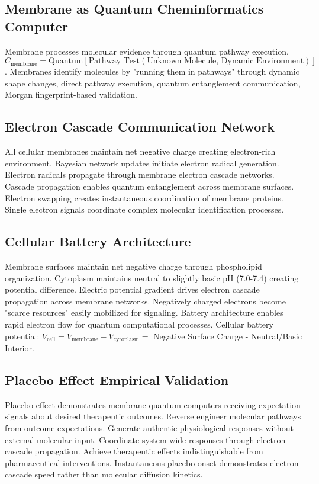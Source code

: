 \documentclass[12pt,a4paper]{article}
\begin{document}
\subsection{Membrane as Quantum Cheminformatics Computer}

Membrane processes molecular evidence through quantum pathway execution. $C_{\text{membrane}} = \text{Quantum}[\text{Pathway Test}(\text{Unknown Molecule, Dynamic Environment})]$. Membranes identify molecules by "running them in pathways" through dynamic shape changes, direct pathway execution, quantum entanglement communication, Morgan fingerprint-based validation.

\subsection{Electron Cascade Communication Network}

All cellular membranes maintain net negative charge creating electron-rich environment. Bayesian network updates initiate electron radical generation. Electron radicals propagate through membrane electron cascade networks. Cascade propagation enables quantum entanglement across membrane surfaces. Electron swapping creates instantaneous coordination of membrane proteins. Single electron signals coordinate complex molecular identification processes.

\subsection{Cellular Battery Architecture}

Membrane surfaces maintain net negative charge through phospholipid organization. Cytoplasm maintains neutral to slightly basic pH (7.0-7.4) creating potential difference. Electric potential gradient drives electron cascade propagation across membrane networks. Negatively charged electrons become "scarce resources" easily mobilized for signaling. Battery architecture enables rapid electron flow for quantum computational processes. Cellular battery potential: $V_{\text{cell}} = V_{\text{membrane}} - V_{\text{cytoplasm}} =$ Negative Surface Charge - Neutral/Basic Interior.

\subsection{Placebo Effect Empirical Validation}

Placebo effect demonstrates membrane quantum computers receiving expectation signals about desired therapeutic outcomes. Reverse engineer molecular pathways from outcome expectations. Generate authentic physiological responses without external molecular input. Coordinate system-wide responses through electron cascade propagation. Achieve therapeutic effects indistinguishable from pharmaceutical interventions. Instantaneous placebo onset demonstrates electron cascade speed rather than molecular diffusion kinetics.
\end{document}
